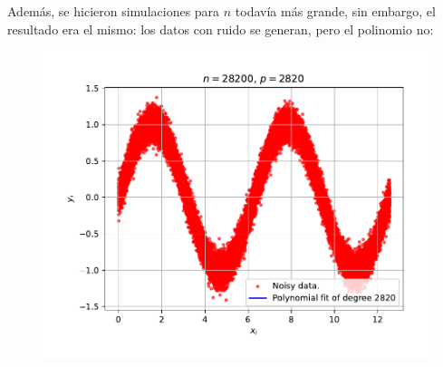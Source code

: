 Además, se hicieron simulaciones para $n$ todavía más grande, sin embargo, el resultado era el mismo: los datos con ruido se generan, pero el polinomio no:

\begin{figure}[h!]
	\centering
	\includegraphics[width=\textwidth]{IMAGENES/n_28200_p_2820.pdf}
\end{figure}









